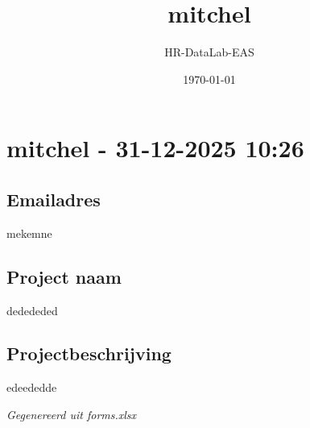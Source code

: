 \documentclass[a4paper,11pt]{article}
\title{mitchel}
\author{HR-DataLab-EAS}
\date{\today}
\begin{document}
\maketitle

\section*{mitchel - 31-12-2025 10:26}
\hrulefill


\subsection*{Emailadres}
mekemne


\subsection*{Project naam}
dedededed


\subsection*{Projectbeschrijving}
edeededde


\hrulefill

\textit{Gegenereerd uit forms.xlsx}
\end{document}
